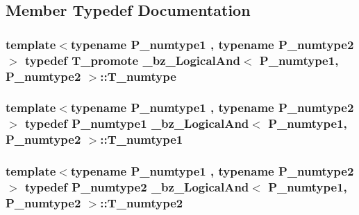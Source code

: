 \subsection{Member Typedef Documentation}
\hypertarget{class__bz__LogicalAnd_a36060bfd17404e848493fe49e4b4f58e}{}
\subsubsection[{T\+\_\+numtype}]{\setlength{\rightskip}{0pt plus 5cm}template$<$typename P\+\_\+numtype1 , typename P\+\_\+numtype2 $>$ typedef {\bf T\+\_\+promote} {\bf \+\_\+bz\+\_\+\+Logical\+And}$<$ P\+\_\+numtype1, P\+\_\+numtype2 $>$\+::{\bf T\+\_\+numtype}}\label{class__bz__LogicalAnd_a36060bfd17404e848493fe49e4b4f58e}
\hypertarget{class__bz__LogicalAnd_a8fe9a073a95e89d5873a068e7a286baf}{}
\subsubsection[{T\+\_\+numtype1}]{\setlength{\rightskip}{0pt plus 5cm}template$<$typename P\+\_\+numtype1 , typename P\+\_\+numtype2 $>$ typedef P\+\_\+numtype1 {\bf \+\_\+bz\+\_\+\+Logical\+And}$<$ P\+\_\+numtype1, P\+\_\+numtype2 $>$\+::{\bf T\+\_\+numtype1}}\label{class__bz__LogicalAnd_a8fe9a073a95e89d5873a068e7a286baf}
\hypertarget{class__bz__LogicalAnd_aa4ac9c330746b4714756c81a23056228}{}
\subsubsection[{T\+\_\+numtype2}]{\setlength{\rightskip}{0pt plus 5cm}template$<$typename P\+\_\+numtype1 , typename P\+\_\+numtype2 $>$ typedef P\+\_\+numtype2 {\bf \+\_\+bz\+\_\+\+Logical\+And}$<$ P\+\_\+numtype1, P\+\_\+numtype2 $>$\+::{\bf T\+\_\+numtype2}}\label{class__bz__LogicalAnd_aa4ac9c330746b4714756c81a23056228}
\hypertarget{class__bz__LogicalAnd_a095005c0ece2a2f0766438835df2ec9b}{}
